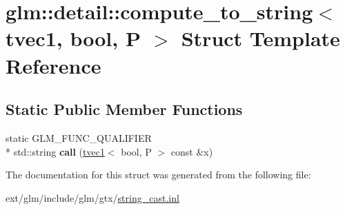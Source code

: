 \hypertarget{structglm_1_1detail_1_1compute__to__string_3_01tvec1_00_01bool_00_01_p_01_4}{\section{glm\-:\-:detail\-:\-:compute\-\_\-to\-\_\-string$<$ tvec1, bool, P $>$ Struct Template Reference}
\label{structglm_1_1detail_1_1compute__to__string_3_01tvec1_00_01bool_00_01_p_01_4}
}
\subsection*{Static Public Member Functions}
\begin{DoxyCompactItemize}
\item 
\hypertarget{structglm_1_1detail_1_1compute__to__string_3_01tvec1_00_01bool_00_01_p_01_4_aea165ad1c3cf2cf3339182c54d28ae1a}{static G\-L\-M\-\_\-\-F\-U\-N\-C\-\_\-\-Q\-U\-A\-L\-I\-F\-I\-E\-R \\*
std\-::string {\bfseries call} (\hyperlink{structglm_1_1tvec1}{tvec1}$<$ bool, P $>$ const \&x)}\label{structglm_1_1detail_1_1compute__to__string_3_01tvec1_00_01bool_00_01_p_01_4_aea165ad1c3cf2cf3339182c54d28ae1a}

\end{DoxyCompactItemize}


The documentation for this struct was generated from the following file\-:\begin{DoxyCompactItemize}
\item 
ext/glm/include/glm/gtx/\hyperlink{string__cast_8inl}{string\-\_\-cast.\-inl}\end{DoxyCompactItemize}
